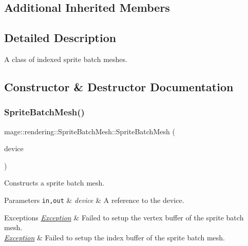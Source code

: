 \subsection*{Additional Inherited Members}


\subsection{Detailed Description}
A class of indexed sprite batch meshes. 

\subsection{Constructor \& Destructor Documentation}
\mbox{\label{classmage_1_1rendering_1_1_sprite_batch_mesh_a992adb566fc9718869f0c6e6f1391df7}} 
\subsubsection{\texorpdfstring{Sprite\+Batch\+Mesh()}{SpriteBatchMesh()}\hspace{0.1cm}{\footnotesize\ttfamily [1/3]}}
{\footnotesize\ttfamily mage\+::rendering\+::\+Sprite\+Batch\+Mesh\+::\+Sprite\+Batch\+Mesh (\begin{DoxyParamCaption}\item[{I\+D3\+D11\+Device \&}]{device }\end{DoxyParamCaption})\hspace{0.3cm}{\ttfamily [explicit]}}

Constructs a sprite batch mesh.


\begin{DoxyParams}[1]{Parameters}
\mbox{\tt in,out}  & {\em device} & A reference to the device. \\
\hline
\end{DoxyParams}

\begin{DoxyExceptions}{Exceptions}
{\em \mbox{\hyperlink{classmage_1_1_exception}{Exception}}} & Failed to setup the vertex buffer of the sprite batch mesh. \\
\hline
{\em \mbox{\hyperlink{classmage_1_1_exception}{Exception}}} & Failed to setup the index buffer of the sprite batch mesh. \\
\hline
\end{DoxyExceptions}
\mbox{\label{classmage_1_1rendering_1_1_sprite_batch_mesh_a961b1df4f0e0b8dc17f968a5e61c2ce6}} 

